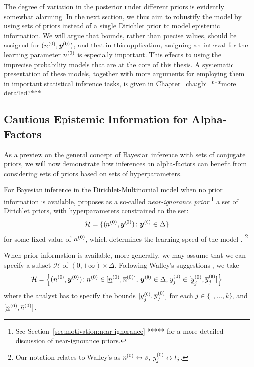 The degree of variation in the posterior under different priors is evidently somewhat alarming.
In the next section, we thus aim to robustify the model by using sets of priors
instead of a single Dirichlet prior to model epistemic information.
We will argue that bounds, rather than precise values,
should be assigned for $(n^{(0)},{\bm y}^{(0)})$, and that in this application,
assigning an interval for the learning parameter $n^{(0)}$ is especially important.
This effects to using the imprecise probability models that are at the core of this thesis.
A systematic presentation of these models,
together with more arguments for employing them in important statistical inference tasks,
is given in Chapter~\ref{cha:gbi} ***more detailed?***.


\subsection{Cautious Epistemic Information for Alpha-Factors}
\label{sec:imprecise-alpha}

As a preview on the general concept of Bayesian inference with sets of conjugate priors,
we will now demonstrate how inferences on alpha-factors can benefit from
considering sets of priors based on sets of hyperparameters.

For Bayesian inference in the Dirichlet-Multinomial model
when no prior information is available,
\textcite{1996:walley::idm} proposes as a so-called \emph{near-ignorance prior}%
\footnote{See Section~\ref{sec:motivation:near-ignorance} ***** for a more detailed discussion of near-ignorance priors.}
a set of Dirichlet priors,
with hyperparameters constrained to the set:
\begin{equation*}
  \mathcal{H}=\{(n^{(0)},{\bm y}^{(0)})\colon{\bm y}^{(0)}\in\Delta\}
\end{equation*}
for some fixed value of $n^{(0)}$, which determines the learning speed of the model
\parencites[p.~218, \S 5.3.2]{1991:walley}[p.~9, \S 2.3]{1996:walley::idm}.%
\footnote{Our notation relates to Walley's as $n^{(0)} \leftrightarrow s$, $y^{(0)}_j \leftrightarrow t_j$.}

When prior information is available, more generally,
we may assume that we can specify a subset $\mathcal{H}$ of $(0,+\infty)\times\Delta$.
Following Walley's suggestions
\parencites[p.~224, \S 5.4.3]{1991:walley}[p.~32, \S 6]{1996:walley::idm},
we take
\begin{equation}
  \label{eq:hyperparams:boxmodel}
  \mathcal{H}
  =
  \left\{
  (n^{(0)},{\bm y}^{(0)})
  \colon
  n^{(0)}\in[\underline{n}^{(0)},\overline{n}^{(0)}],\,
  {\bm y}^{(0)}\in\Delta,\,
  y^{(0)}_j\in[\underline{y}^{(0)}_j,\overline{y}^{(0)}_j]
  \right\}
\end{equation}
where the analyst has to specify the bounds
$[\underline{y}^{(0)}_j,\overline{y}^{(0)}_j]$ for each $j\in\{1,\dots,k\}$,
and $[\underline{n}^{(0)},\overline{n}^{(0)}]$.

